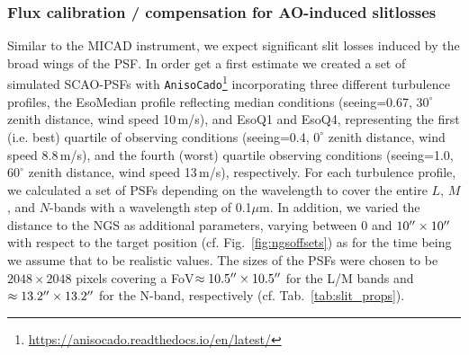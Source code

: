\subsubsection{Flux calibration / compensation for AO-induced slitlosses}\label{ssec:aoslitloss}
Similar to the MICAD instrument, we expect significant slit losses induced by the broad wings of the \ac{PSF}. In order get a first estimate we created a set of simulated \ac{SCAO}-\ac{PSF}s with \texttt{AnisoCado}\footnote{\url{https://anisocado.readthedocs.io/en/latest/}} incorporating three different turbulence profiles, the EsoMedian profile reflecting median conditions (seeing=0.67\arcsec, $30^\circ$ zenith distance, wind speed 10\,m/s), and EsoQ1 and EsoQ4, representing the first (i.e. best) quartile of observing conditions (seeing=0.4\arcsec, $0^\circ$ zenith distance, wind speed 8.8\,m/s), and the fourth (worst) quartile observing conditions  (seeing=1.0\arcsec, $60^\circ$ zenith distance, wind speed 13\,m/s), respectively. For each turbulence profile, we calculated a set of \ac{PSF}s depending on the wavelength to cover the entire $L$, $M$, and $N$-bands with a wavelength step of 0.1$\mu$m. In addition, we varied the distance to the \ac{NGS} as additional parameters, varying between 0 and $10\hbox{$^{\prime\prime}$}\times10\hbox{$^{\prime\prime}$}$ with respect to the target position (cf. Fig.~\ref{fig:ngsoffsets}) as for the time being we assume that to be realistic values. The sizes of the \ac{PSF}s were chosen to be $2048\times2048$ pixels covering a \ac{FoV}$\approx10.5\hbox{$^{\prime\prime}$}\times10.5\hbox{$^{\prime\prime}$}$ for the L/M bands and $\approx13.2\hbox{$^{\prime\prime}$}\times13.2\hbox{$^{\prime\prime}$}$ for the N-band, respectively (cf. Tab.~\ref{tab:slit_props}). \\


